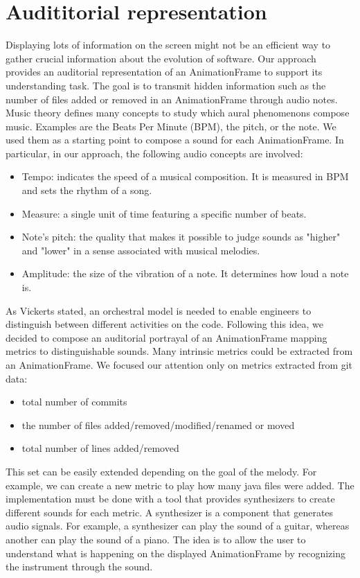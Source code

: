 \section{Audititorial representation}
\label{sec:audioApproach}
Displaying lots of information on the screen might not be an efficient way to gather crucial information about the evolution of software. Our approach provides an auditorial representation of an AnimationFrame to support its understanding task. The goal is to transmit hidden information such as the number of files added or removed in an AnimationFrame through audio notes. 
\bigbreak
Music theory defines many concepts to study which aural phenomenons compose music. Examples are the Beats Per Minute (BPM), the pitch, or the note. We used them as a starting point to compose a sound for each AnimationFrame. In particular, in our approach, the following audio concepts are involved:
\begin{itemize}
    \item Tempo: indicates the speed of a musical composition. It is measured in BPM and sets the rhythm of a song. 
    \item Measure: a single unit of time featuring a specific number of beats. 
	\item Note's pitch: the quality that makes it possible to judge sounds as "higher" and "lower" in a sense associated with musical melodies.
	\item Amplitude: the size of the vibration of a note. It determines how loud a note is.
\end{itemize}
\bigbreak
As Vickerts \cite{Vickers2004} stated, an orchestral model is needed to enable engineers to distinguish between different activities on the code. Following this idea, we decided to compose an auditorial portrayal of an  AnimationFrame mapping metrics to distinguishable sounds. Many intrinsic metrics could be extracted from an AnimationFrame. We focused our attention only on metrics extracted from git data:
\begin{itemize}
    \item total number of commits
    \item the number of files added/removed/modified/renamed or moved
    \item total number of lines added/removed
\end{itemize}
This set can be easily extended depending on the goal of the melody. For example, we can create a new metric to play how many java files were added. The implementation must be done with a tool that provides synthesizers to create different sounds for each metric. A synthesizer is a component that generates audio signals. For example, a synthesizer can play the sound of a guitar, whereas another can play the sound of a piano. The idea is to allow the user to understand what is happening on the displayed AnimationFrame by recognizing the instrument through the sound. 

